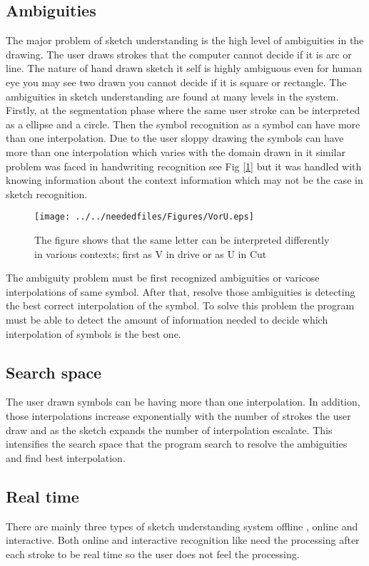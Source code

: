 \subsection{Ambiguities}
\label{sec:Ambiguities}
 	
The major problem of sketch understanding is the high level of ambiguities in the drawing. The user draws strokes that the computer cannot decide if it is arc or line. The nature of hand drawn sketch it self is highly ambiguous even for human eye you may see two drawn you cannot decide if it is square or rectangle.
 The ambiguities in sketch understanding are found at many levels in the system. Firstly, at the segmentation phase where the same user stroke can be interpreted as a ellipse and a circle. Then the symbol recognition as a symbol can have more than one interpolation. Due to the user sloppy drawing the symbols can have more than one interpolation which varies with the domain drawn in it similar problem was faced in handwriting recognition see Fig [\ref{fig:VorU}] but it was handled with knowing information about the context information which may not be the case in sketch recognition. 
 
\begin{figure}	
	\centering
		\texttt{[image: ../../neededfiles/Figures/VorU.eps]}
	\caption[Ambiguities Handwriting ]{The figure shows that the same letter can be interpreted differently in various contexts; first as V in drive or as U in Cut}
\label{fig:VorU}
\end{figure}

The ambiguity problem must be first recognized ambiguities or varicose interpolations of same symbol. After that, resolve those ambiguities is detecting the best correct interpolation of the symbol.  To solve this problem the program must be able to detect the amount of information needed to decide which interpolation of symbols is the best one. 




\subsection{Search space}
\label{sec:Searchspace}


The user drawn symbols can be having more than one interpolation. In addition, those interpolations increase exponentially with the number of strokes the user draw and as the sketch expands the number of interpolation escalate. This intensifies the search space that the program search to resolve the ambiguities and find best interpolation.

\subsection{Real time}
\label{sec:Realtime}


There are mainly three types of sketch understanding system offline \cite{Vibratory8}, online and interactive. Both online and interactive recognition like \cite{incrmentintention41, SmartSketch56} need the processing after each stroke to be real time so the user does not feel the processing.  

